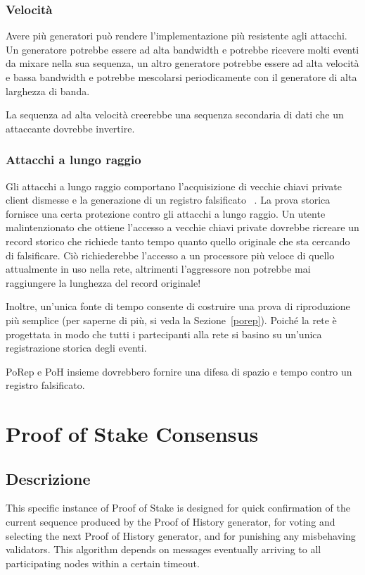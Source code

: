 \documentclass[12pt]{article}
\begin{document}
\subsubsection{Velocità}
Avere più generatori può rendere l'implementazione più resistente agli attacchi. Un generatore potrebbe essere ad alta bandwidth 
e potrebbe ricevere molti eventi da mixare nella sua sequenza, un altro generatore potrebbe essere ad alta velocità e bassa bandwidth e potrebbe mescolarsi periodicamente con il generatore di alta larghezza di banda.

La sequenza ad alta velocità creerebbe una sequenza secondaria di dati che un attaccante dovrebbe invertire.

\subsubsection{Attacchi a lungo raggio}

Gli attacchi a lungo raggio comportano l'acquisizione di vecchie chiavi private client dismesse e la generazione di un registro falsificato ~\cite{casper}. La prova storica fornisce una certa protezione contro gli attacchi a lungo raggio. Un utente malintenzionato che ottiene l'accesso a vecchie chiavi private dovrebbe ricreare un record storico che richiede tanto tempo quanto quello originale che sta cercando di falsificare. Ciò richiederebbe l'accesso a un processore più veloce di quello attualmente in uso nella rete, altrimenti l'aggressore non potrebbe mai  raggiungere la lunghezza del record originale! 

Inoltre, un'unica fonte di tempo consente di costruire una prova di riproduzione più semplice (per saperne di più, si veda la Sezione~\ref{porep}). Poiché la rete è progettata in modo che tutti i partecipanti alla rete si basino su un'unica registrazione storica degli eventi.

PoRep e PoH insieme dovrebbero fornire una difesa di spazio e tempo contro un registro falsificato.


\section{Proof of Stake Consensus}\label{proof_of_stake}
\subsection{Descrizione}
This specific instance of Proof of Stake is designed for quick confirmation of the current sequence produced by the Proof of History generator, for voting and selecting the next Proof of History generator, and for punishing any misbehaving validators. This algorithm depends on messages eventually arriving to all participating nodes within a certain timeout.
\end{document}
